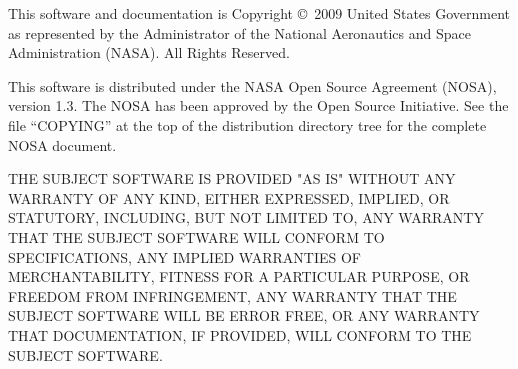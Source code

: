 This software and documentation is Copyright \copyright\ 2009 United
States Government as represented by the Administrator of the National
Aeronautics and Space Administration (NASA).  All Rights Reserved.

This software is distributed under the NASA Open Source Agreement
(NOSA), version 1.3.  The NOSA has been approved by the Open Source
Initiative.  See the file ``COPYING'' at the top of the distribution
directory tree for the complete NOSA document.

THE SUBJECT SOFTWARE IS PROVIDED "AS IS" WITHOUT ANY WARRANTY OF ANY
KIND, EITHER EXPRESSED, IMPLIED, OR STATUTORY, INCLUDING, BUT NOT
LIMITED TO, ANY WARRANTY THAT THE SUBJECT SOFTWARE WILL CONFORM TO
SPECIFICATIONS, ANY IMPLIED WARRANTIES OF MERCHANTABILITY, FITNESS FOR
A PARTICULAR PURPOSE, OR FREEDOM FROM INFRINGEMENT, ANY WARRANTY THAT
THE SUBJECT SOFTWARE WILL BE ERROR FREE, OR ANY WARRANTY THAT
DOCUMENTATION, IF PROVIDED, WILL CONFORM TO THE SUBJECT SOFTWARE.
